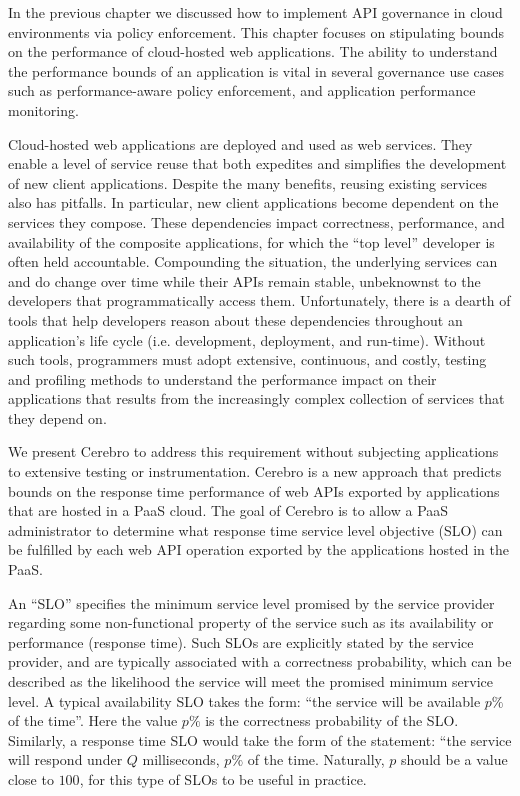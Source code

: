 In the previous chapter we discussed how to implement API governance in
cloud environments via policy enforcement. This chapter focuses on stipulating
bounds on the performance of cloud-hosted web applications.
The ability to understand the performance bounds
of an application is vital in several governance use cases such as
performance-aware policy enforcement, and application performance monitoring.

Cloud-hosted web applications are deployed and used as web services. 
They enable a level of service reuse that both expedites
and simplifies the development of new client applications.
Despite the many benefits, reusing existing services also has pitfalls.  
In particular, new client applications become dependent on the 
services they compose.  These dependencies
impact correctness, performance, and availability of the composite 
applications, for which the ``top level'' developer is often held accountable.  
Compounding the situation, the underlying services can and do change over time
while their APIs remain stable,
unbeknownst to the developers that programmatically access them.
Unfortunately, there is a dearth of tools that help developers reason about these 
dependencies throughout an application's 
life cycle (i.e. development, deployment, and run-time).  Without such tools, 
programmers must adopt extensive, continuous, and costly, testing and profiling methods
to understand the performance impact on their applications
that results from the increasingly complex collection of
services that they depend on. 

We present Cerebro to address this requirement without subjecting applications to extensive
testing or instrumentation. Cerebro is a new approach that 
predicts bounds on the response time performance of web
APIs exported by applications that are hosted in a PaaS cloud.
The goal of Cerebro is to allow 
a PaaS administrator to determine what response time service level objective (SLO) can be
fulfilled by each web API operation exported by the applications
hosted in the PaaS.

An ``SLO'' specifies the minimum service level promised by the
service provider regarding some non-functional property of the service such as
its availability or performance (response time). 
Such SLOs are explicitly
stated by the service provider, and are typically associated with a correctness probability,
which can be described as the likelihood the service will meet the promised
minimum service level. A typical availability SLO
takes the form: ``the service will be available $p\%$ of the time''.
Here the value $p\%$ is the correctness probability of the SLO. Similarly, a
response time SLO would take the form of the statement: ``the service will respond 
under $Q$ milliseconds, $p\%$ of the time. Naturally, $p$ should be a value close
to $100$, for this type of SLOs to be useful in practice.

